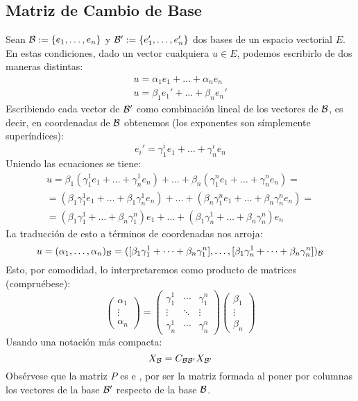 \subsection{Matriz de Cambio de Base}
\label{A1_cambioBase}
Sean $\mathcal{B}:=\{e_1,\dots,e_n\}$ y $\mathcal{B}':=\{e_1',\dots,e_n'\}$ dos bases de un espacio vectorial $E$.
En estas condiciones, dado un vector cualquiera $u\in E$, podemos escribirlo de dos maneras distintas:
\begin{gather}
	u=\alpha_1e_1+\dots+\alpha_ne_n\\
	\label{A1_eq_escritura2}
	u=\beta_1e_1'+\dots+\beta_ne_n'
\end{gather}
Escribiendo cada vector de $\mathcal{B}'$ como combinación lineal de los vectores de $\mathcal{B}$, es decir, en coordenadas de $\mathcal{B}$ obtenemos (los exponentes son símplemente superíndices):
\begin{equation}
	e_i'=\gamma_1^ie_1+\dots+\gamma_n^ie_n
\end{equation}
Uniendo las ecuaciones se tiene:
\begin{multline}
	u=\beta_1(\gamma_1^1e_1+\dots+\gamma_n^1e_n)+\dots+\beta_n(\gamma_1^ne_1+\dots+\gamma_n^ne_n)=\\
	=(\beta_1\gamma_1^1e_1+\dots+\beta_1\gamma_n^1e_n)+\dots+(\beta_n\gamma_1^ne_1+\dots+\beta_n\gamma_n^ne_n)=\\
	=(\beta_1\gamma_1^1+\dots+\beta_n\gamma_1^n)e_1+\dots+(\beta_1\gamma_n^1+\dots+\beta_n\gamma_n^n)e_n
\end{multline}
La traducción de esto a términos de coordenadas nos arroja:
\begin{equation}
	u=(\alpha_1,\dots,\alpha_n)_{\mathcal{B}}=([\beta_1\gamma_1^1+\dots+\beta_n\gamma_1^n],\dots,[\beta_1\gamma_n^1+\dots+\beta_n\gamma_n^n])_{\mathcal{B}}
\end{equation}
Esto, por comodidad, lo interpretaremos como producto de matrices (compruébese):
\begin{equation}
	\begin{pmatrix}
	\alpha_1\\
	\vdots\\
	\alpha_n
	\end{pmatrix}=
	\begin{pmatrix}
	\gamma_1^1 & \cdots & \gamma_1^n\\
	\vdots & \ddots & \vdots\\
	\gamma_n^1 & \cdots & \gamma_n^n
	\end{pmatrix}
	\begin{pmatrix}
	\beta_1\\
	\vdots\\
	\beta_n
	\end{pmatrix}
\end{equation}
Usando una notación más compacta:
\begin{equation}
	X_{\mathcal{B}}=C_{\mathcal{B}\mathcal{B}'}X_{\mathcal{B}'}
\end{equation}
Obsérvese que la matriz $P$ es  e , por ser la matriz formada al poner por columnas los vectores de la base $\mathcal{B}'$ respecto de la base $\mathcal{B}$.

